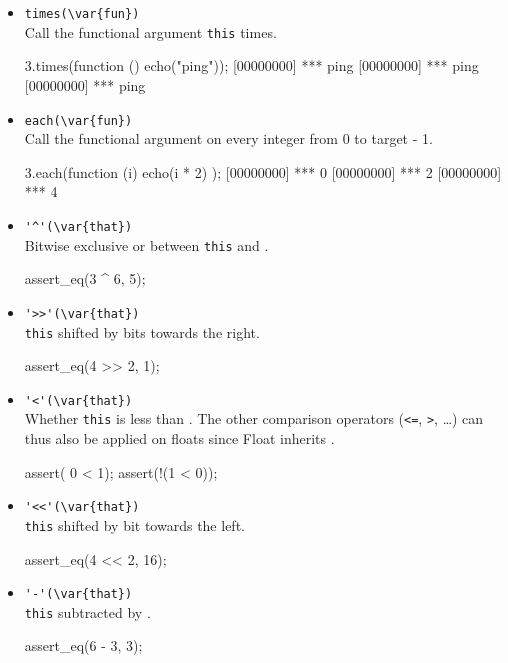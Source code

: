 \begin{itemize}
\item \lstinline|times(\var{fun})|\\
  Call the functional argument  \lstinline|this| times.

\begin{urbiscript}
3.times(function () { echo("ping")});
[00000000] *** ping
[00000000] *** ping
[00000000] *** ping
\end{urbiscript}

\item \lstinline|each(\var{fun})|\\
  Call the functional argument  on every integer from 0 to
  target - 1.
\begin{urbiscript}
3.each(function (i) { echo(i * 2) });
[00000000] *** 0
[00000000] *** 2
[00000000] *** 4
\end{urbiscript}

\item \lstinline|'^'(\var{that})|\\
  Bitwise exclusive or between \lstinline|this| and .
\begin{urbiscript}
assert_eq(3 ^ 6, 5);
\end{urbiscript}

\item \lstinline|'>>'(\var{that})|\\%
  \lstinline|this| shifted by  bits towards the right.
\begin{urbiscript}
assert_eq(4 >> 2, 1);
\end{urbiscript}

\item \lstinline|'<'(\var{that})|\\
  Whether \lstinline|this| is less than . The other comparison
  operators (\lstinline|<=|, \lstinline|>|, \ldots) can thus also be
  applied on floats since Float inherits .
\begin{urbiscript}
assert(  0 < 1);
assert(!(1 < 0));
\end{urbiscript}

\item \lstinline|'<<'(\var{that})|\\
  \lstinline|this| shifted by  bit towards the left.
\begin{urbiscript}
assert_eq(4 << 2, 16);
\end{urbiscript}

\item \lstinline|'-'(\var{that})|\\
  \lstinline|this| subtracted by .
\begin{urbiscript}
assert_eq(6 - 3, 3);
\end{urbiscript}


\end{itemize}
